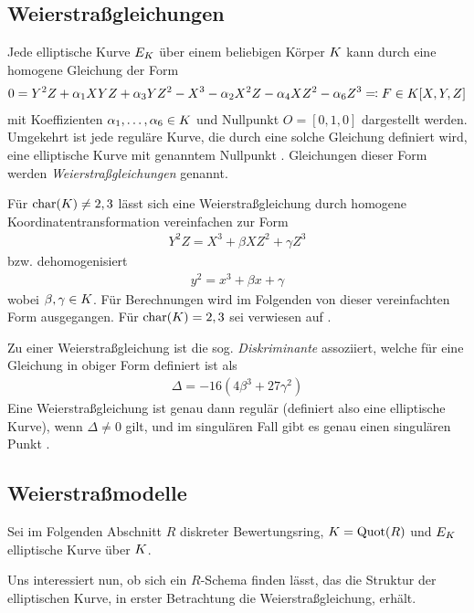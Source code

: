 \documentclass[german]{scrreprt}
\begin{document}
\subsection{Weierstraßgleichungen}
Jede elliptische Kurve $E_{K}$ über einem beliebigen Körper $K$ kann
durch eine homogene Gleichung der Form
\begin{gather*}
  0 = Y^2 Z + \alpha_1 XYZ + \alpha_3 YZ^2 - X^3 - \alpha_2X^2 Z - \alpha_4 XZ^2 - \alpha_6 Z^3
  \eqqcolon F\in K[X,Y,Z]
\end{gather*}
mit Koeffizienten $\alpha_1,\dotsc,\alpha_6\in K$ und Nullpunkt $O=[0,1,0]$
dargestellt werden. Umgekehrt ist jede reguläre Kurve, die durch eine
solche Gleichung definiert wird, eine elliptische Kurve mit genanntem
Nullpunkt \cite[Proposition III.3.1]{silverman}.
Gleichungen dieser Form werden \emph{Weierstraßgleichungen} genannt.

Für $\operatorname{char}(K)\neq 2,3$ lässt sich eine Weierstraßgleichung durch
homogene Koordinatentransformation vereinfachen zur Form
\begin{gather*}
  Y^2 Z = X^3 + \beta XZ^2 + \gamma Z^3
\end{gather*}
bzw. dehomogenisiert
\begin{gather*}
  y^2 = x^3 + \beta x + \gamma
\end{gather*}
wobei $\beta,\gamma\in K$.
Für Berechnungen wird im Folgenden von dieser vereinfachten Form
ausgegangen. Für $\operatorname{char}(K)=2,3$ sei verwiesen auf
\cite[Appendix: Elliptic Curves in Characteristics 2 and 3]{silverman}.


Zu einer Weierstraßgleichung ist die sog. \emph{Diskriminante}
assoziiert, welche für eine Gleichung in obiger Form definiert ist als
\begin{gather*}
  \Delta = -16\left(4\beta^3 + 27\gamma^2\right)
\end{gather*}
Eine Weierstraßgleichung ist genau dann regulär (definiert also eine
elliptische Kurve), wenn $\Delta\neq 0$ gilt,
und im singulären Fall gibt es genau einen singulären Punkt
\cite[Proposition III.1.4]{silverman}.


\subsection{Weierstraßmodelle}
Sei im Folgenden Abschnitt $R$ diskreter Bewertungsring,
$K=\operatorname{Quot}(R)$ und $E_{K}$ elliptische Kurve über $K$.

Uns interessiert nun, ob sich ein $R$-Schema finden lässt, das die
Struktur der elliptischen Kurve, in erster Betrachtung die
Weierstraßgleichung, erhält.
\end{document}
